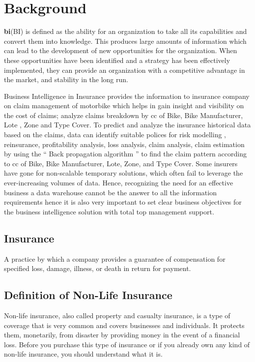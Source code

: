 \section{Background}\label{sec:bkgrnd}%
\textbf {\acl{bi}}(BI) is defined as the ability for an organization to take all its capabilities and convert them into knowledge. This produces large amounts of information which can lead to the development of new opportunities for the organization. When these opportunities have been identified and a strategy has been effectively implemented, they can provide an organization with a competitive advantage in the market, and stability in the long run.\cite{chen2012business}
\par
Business Intelligence in Insurance provides the information to insurance company on claim management of motorbike which helps in gain insight and visibility on the cost of claims; analyze claims breakdown by \acs{cc} of Bike, Bike Manufacturer, Lote , Zone and Type Cover. 
To predict and analyze the insurance historical data based on the claims, data can identify suitable polices for risk modelling , reinsurance, profitability analysis, loss analysis, claim analysis, claim estimation by  using the “ Back propagation algorithm ” to find the claim pattern according to \acs{cc} of Bike, Bike Manufacturer, Lote, Zone, and Type Cover.
Some insurers have gone for non-scalable temporary solutions, which often fail to leverage the ever-increasing volumes of data. Hence, recognizing the need for an effective business a data warehouse cannot be the answer to all the information requirements hence it is also very important to set clear business objectives for the business intelligence solution with total top management support.
 \par
\newpage
\subsection{Insurance}
A practice by which a company provides a guarantee of compensation for specified loss, damage, illness, or death in return for payment. 
\subsection{Definition of Non-Life Insurance }
Non-life insurance, also called property and casualty insurance, is a type of coverage that is very common and covers businesses and individuals. It protects them, monetarily, from disaster by providing money in the event of a financial loss. Before you purchase this type of insurance or if you already own any kind of non-life insurance, you should understand what it is.

